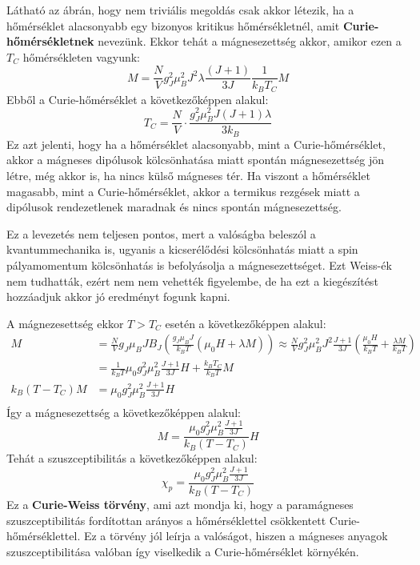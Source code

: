 \documentclass[../main.tex]{subfiles}
\begin{document}
Látható az ábrán, hogy nem triviális megoldás csak akkor létezik, ha a hőmérséklet alacsonyabb egy bizonyos kritikus hőmérsékletnél, amit \textbf{Curie-hőmérsékletnek} nevezünk.
Ekkor tehát a mágnesezettség akkor, amikor ezen a $T_C$ hőmérsékleten vagyunk:
\begin{equation}
    M = \frac{N}{V} g^2_J \mu^2_B J^2 \lambda \frac{(J+1)}{3J} \frac{1}{k_B T_C} M
\end{equation}
Ebből a Curie-hőmérséklet a következőképpen alakul:
\begin{equation}
    \boxed{T_C = \frac{N}{V} \cdot \frac{g^2_J \mu^2_B J(J+1) \lambda}{3 k_B}}
\end{equation}
Ez azt jelenti, hogy ha a hőmérséklet alacsonyabb, mint a Curie-hőmérséklet, akkor a mágneses dipólusok kölcsönhatása miatt spontán mágnesezettség jön létre, még akkor is, ha nincs külső mágneses tér. Ha viszont a hőmérséklet magasabb, mint a Curie-hőmérséklet, akkor a termikus rezgések miatt a dipólusok rendezetlenek maradnak és nincs spontán mágnesezettség.

Ez a levezetés nem teljesen pontos, mert a valóságba beleszól a kvantummechanika is, ugyanis a kicserélődési kölcsönhatás miatt a spin pályamomentum kölcsönhatás is befolyásolja a mágnesezettséget.
Ezt Weiss-ék nem tudhatták, ezért nem nem vehették figyelembe, de ha ezt a kiegészítést hozzáadjuk akkor jó eredményt fogunk kapni.

A mágnezesettség ekkor $T > T_C$ esetén a következőképpen alakul:
\begin{equation}
    \begin{aligned}
        M &= \frac{N}{V} g_J \mu_B J B_J \left( \frac{g_J \mu_B J}{k_B T} \left( \mu_0 H + \lambda M \right) \right) \approx \frac{N}{V} g^2_J \mu^2_B J^2 \frac{J + 1}{3J} \left( \frac{\mu_0 H}{k_B T} + \frac{\lambda M}{k_B T} \right) \\
        & = \frac{1}{k_B T} \mu_0 g^2_J \mu^2_B \frac{J + 1}{3 J} H + \frac{k_B T_C}{k_B T} M \\
        k_B (T - T_C) M &= \mu_0 g^2_J \mu^2_B \frac{J + 1}{3 J} H \\
    \end{aligned}
\end{equation}
Így a mágnesezettség a következőképpen alakul:
\begin{equation}
    M = \frac{\mu_0 g^2_J \mu^2_B \frac{J + 1}{3 J}}{k_B (T - T_C)} H
\end{equation}
Tehát a szuszceptibilitás a következőképpen alakul:
\begin{equation}
    \boxed{\chi_p = \frac{\mu_0 g^2_J \mu^2_B \frac{J + 1}{3 J}}{k_B (T - T_C)}}
\end{equation}
Ez a \textbf{Curie-Weiss törvény}, ami azt mondja ki, hogy a paramágneses szuszceptibilitás fordítottan arányos a hőmérséklettel csökkentett Curie-hőmérséklettel. Ez a törvény jól leírja a valóságot, hiszen a mágneses anyagok
szuszceptibilitása valóban így viselkedik a Curie-hőmérséklet környékén.
\end{document}
